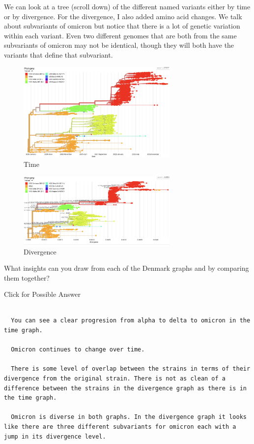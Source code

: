 \documentclass[
]{book}
\begin{document}
We can look at a tree (scroll down) of the different named variants either by time or by divergence. For the divergence, I also added amino acid changes. We talk about subvariants of omicron but notice that there is a lot of genetic variation within each variant. Even two different genomes that are both from the same subvariants of omicron may not be identical, though they will both have the variants that define that subvariant.

\begin{figure}
\centering
\includegraphics[width=0.7\textwidth,height=\textheight]{./Figures/DenmarkRectangularTime.png}
\caption{Time}
\end{figure}

\hfill\break

\begin{figure}
\centering
\includegraphics[width=0.7\textwidth,height=\textheight]{./Figures/DenmarkRectangularDivergence.png}
\caption{Divergence}
\end{figure}

\hfill\break
What insights can you draw from each of the Denmark graphs and by comparing them together?

Click for Possible Answer

\begin{verbatim}
  
  You can see a clear progresion from alpha to delta to omicron in the time graph.

  Omicron continues to change over time.
  
  There is some level of overlap between the strains in terms of their divergence from the original strain. There is not as clean of a difference between the strains in the divergence graph as there is in the time graph.
  
  Omicron is diverse in both graphs. In the divergence graph it looks like there are three different subvariants for omicron each with a jump in its divergence level.
\end{verbatim}
\end{document}
